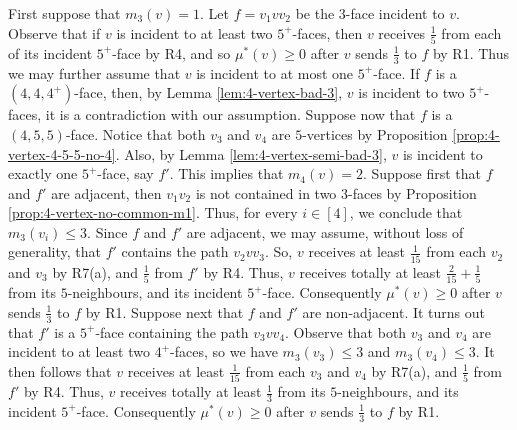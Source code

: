 \documentclass[12pt, reqno]{amsart}
\theoremstyle{plain}
\theoremstyle{definition}
\numberwithin{equation}{section}
\begin{document}
First suppose that $m_3(v)=1$. Let $f=v_1vv_2$ be the $3$-face incident to $v$. Observe that if $v$ is incident to at least two $5^+$-faces, then $v$ receives $\frac{1}{5}$ from each of its incident $5^+$-face by R4, and so $\mu^*(v)\geq 0$ after $v$ sends $\frac{1}{3}$ to $f$ by R1. Thus we may further assume that $v$ is incident to at most one $5^+$-face.
If $f$ is a $(4,4,4^+)$-face, then, by Lemma \ref{lem:4-vertex-bad-3}, $v$ is incident to two $5^+$-faces, it is a contradiction with our assumption. 
Suppose now that $f$ is a $(4,5,5)$-face.  Notice that both $v_3$ and $v_4$ are $5$-vertices by Proposition \ref{prop:4-vertex-4-5-5-no-4}.  Also, by Lemma \ref{lem:4-vertex-semi-bad-3}, $v$ is incident to exactly one $5^+$-face, say $f'$. %
This implies that $m_4(v)=2$. 
Suppose first that $f$ and $f'$ are adjacent, then $v_1v_2$ is not contained in two $3$-faces by Proposition \ref{prop:4-vertex-no-common-m1}. Thus, for every $i\in [4]$, we conclude that $m_3(v_i)\leq 3$. 
Since $f$ and $f'$ are adjacent, we may assume, without loss of generality, that $f'$ contains the path $v_2vv_3$.  So, $v$ receives at least $\frac{1}{15}$ from each $v_2$ and $v_3$ by R7(a), and $\frac{1}{5}$ from $f'$ by R4.  Thus, $v$ receives totally at least $\frac{2}{15}+\frac{1}{5}$ from its $5$-neighbours, and its incident $5^+$-face. Consequently  $\mu^*(v)\geq 0$ after $v$ sends $\frac{1}{3}$ to $f$ by R1. 
Suppose next that $f$ and $f'$ are non-adjacent. It turns out that $f'$ is a $5^+$-face containing the path $v_3vv_4$. Observe that both $v_3$ and $v_4$ are incident to at least two $4^+$-faces, so  we have $m_3(v_3)\leq 3$ and $m_3(v_4)\leq 3$. It then follows that $v$ receives at least $\frac{1}{15}$ from each $v_3$ and $v_4$ by R7(a), and $\frac{1}{5}$ from $f'$ by R4.  Thus, $v$ receives totally at least $\frac{1}{3}$ from its $5$-neighbours, and its incident $5^+$-face. Consequently  $\mu^*(v)\geq 0$ after $v$ sends $\frac{1}{3}$ to $f$ by R1. 
\end{document}
